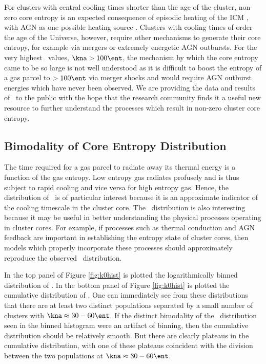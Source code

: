 For clusters with central cooling times shorter than the age of the
cluster, non-zero core entropy is an expected consequence of episodic
heating of the ICM \citep{agnframework}, with AGN as one possible
heating source \citep{1997MNRAS.288..355B, 2000ApJ...532...17L,
2001Natur.414..425V, 2001ApJ...549..832S, 2002MNRAS.332..729C,
2002Natur.418..301B, 2002MNRAS.331..545B, 2002MNRAS.333..145N,
2002ApJ...581..223R, 2002MNRAS.335..610A, 2004MNRAS.348.1105O,
2004ApJ...613..811M, 2004ApJ...615..681R, 2004ApJ...617..896H,
2004MNRAS.355..995D, 2005ApJ...622..847S, pizzolato05,
2006ApJ...643..120B, 2006ApJ...638..659M}. Clusters with cooling times
of order the age of the Universe, however, require other mechanisms to
generate their core entropy, for example via mergers or extremely
energetic AGN outbursts. For the very highest \kna\ values, $\kna >
100 \ent$, the mechanism by which the core entropy came to be so large
is not well understood as it is difficult to boost the entropy of a
gas parcel to $> 100 \ent$ via merger shocks
\citep{2008MNRAS.386.1309M} and would require AGN outburst energies
which have never been observed. We are providing the data and results
of \accept\ to the public with the hope that the research community
finds it a useful new resource to further understand the processes
which result in non-zero cluster core entropy.

\subsection{Bimodality of Core Entropy Distribution}
\label{sec:entsuppbimod}

The time required for a gas parcel to radiate away its thermal energy
is a function of the gas entropy. Low entropy gas radiates profusely
and is thus subject to rapid cooling and vice versa for high entropy
gas. Hence, the distribution of \kna\ is of particular interest
because it is an approximate indicator of the cooling timescale in the
cluster core. The \kna\ distribution is also interesting because it
may be useful in better understanding the physical processes operating
in cluster cores. For example, if processes such as thermal conduction
and AGN feedback are important in establishing the entropy state of
cluster cores, then models which properly incorporate these processes
should approximately reproduce the observed \kna\ distribution.

In the top panel of Figure \ref{fig:k0hist} is plotted the
logarithmically binned distribution of \kna. In the bottom panel of
Figure \ref{fig:k0hist} is plotted the cumulative distribution of
\kna. One can immediately see from these distributions that there are
at least two distinct populations separated by a small number of
clusters with $\kna \approx 30-60 \ent$. If the distinct bimodality of
the \kna\ distribution seen in the binned histogram were an artifact
of binning, then the cumulative distribution should be relatively
smooth. But there are clearly plateaus in the cumulative distribution,
with one of these plateaus coincident with the division between the
two populations at $\kna \approx 30-60 \ent$.

